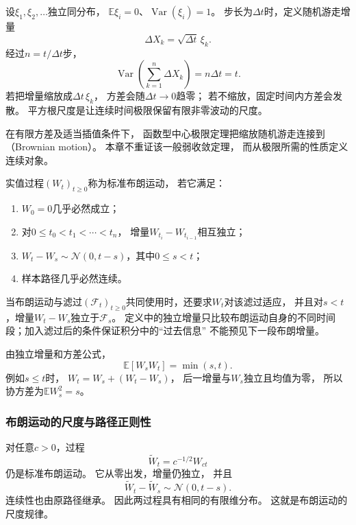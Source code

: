 设$\xi_{1},\xi_{2},\ldots$独立同分布， $\mathbb{E}\xi_{i}=0$、$\operatorname{Var}
(\xi_{i})=1$。 步长为$\Delta t$时，定义随机游走增量
\[
	\Delta X_{k}=\sqrt{\Delta t}\,\xi_{k}.
\]
经过$n=t/\Delta t$步，
\[
	\operatorname{Var}\left( \sum_{k=1}^{n}\Delta X_{k}\right) = n\Delta t=t.
\]
若把增量缩放成$\Delta t\,\xi_{k}$， 方差会随$\Delta t\to0$趋零；
若不缩放，固定时间内方差会发散。
平方根尺度是让连续时间极限保留有限非零波动的尺度。

在有限方差及适当插值条件下， 函数型中心极限定理把缩放随机游走连接到（Brownian motion）。 本章不重证该一般弱收敛定理，
而从极限所需的性质定义连续对象。

\begin{definition}[标准布朗运动]
	\label{def:dynamical-standard-brownian-motion} 实值过程$(W_{t})_{t\geq0}$称为标准布朗运动，
	若它满足：
	\begin{enumerate}
		\item $W_{0}=0$几乎必然成立；

		\item 对$0\leq t_{0}<t_{1}<\cdots<t_{n}$， 增量$W_{t_i}-W_{t_{i-1}}$相互独立；

		\item $W_{t}-W_{s}\sim\mathcal{N}(0,t-s)$，其中$0\leq s<t$；

		\item 样本路径几乎必然连续。
	\end{enumerate}
\end{definition}

当布朗运动与滤过$(\mathcal{F}_t)_{t\geq0}$共同使用时，还要求$W_t$对该滤过适应，
并且对$s<t$，增量$W_t-W_s$独立于$\mathcal{F}_s$。
定义中的独立增量只比较布朗运动自身的不同时间段；加入滤过后的条件保证积分中的“过去信息”
不能预见下一段布朗增量。

由独立增量和方差公式，
\begin{equation}
	\mathbb{E}[W_{s}W_{t}]=\min(s,t). \label{eq:dynamical-brownian-covariance}
\end{equation}
例如$s\leq t$时， $W_{t}=W_{s}+(W_{t}-W_{s})$， 后一增量与$W_{s}$独立且均值为零，
所以协方差为$\mathbb{E}W_{s}^{2}=s$。

\subsubsection{布朗运动的尺度与路径正则性}

对任意$c>0$，过程
\[
	\widetilde W_{t}= c^{-1/2}W_{ct}
\]
仍是标准布朗运动。 它从零出发，增量仍独立， 并且
\[
	\widetilde W_{t}-\widetilde W_{s}\sim \mathcal{N}(0,t-s).
\]
连续性也由原路径继承。 因此两过程具有相同的有限维分布。
这就是布朗运动的尺度规律。

